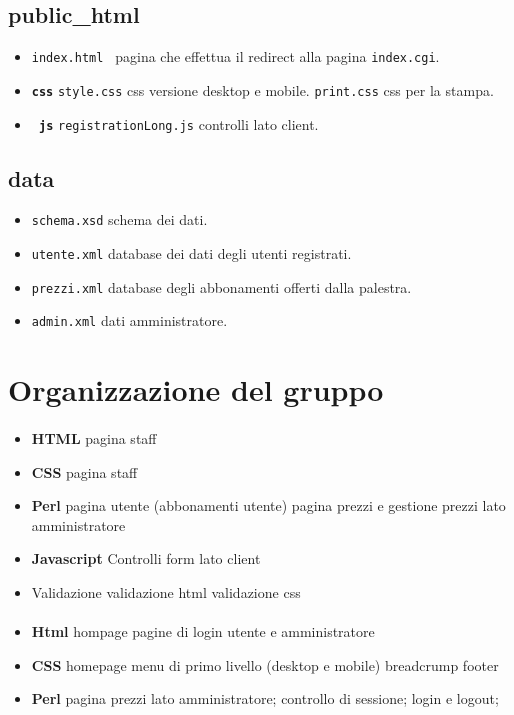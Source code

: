 \documentclass[12pt,a4paper]{article}
\begin{document}
\subsection{public\_html}
\begin{itemize}
	\item \texttt{index.html } pagina che effettua il redirect alla pagina \texttt{index.cgi}.
	\item \texttt{\textbf{css}}
		\subitem \texttt{style.css} css versione desktop e mobile. 
		\subitem \texttt{print.css} css per la stampa.
	\item\texttt{\textbf{ js}}
	\subitem \texttt{registrationLong.js} controlli lato client. 
\end{itemize}
\subsection{data}
\begin{itemize}
	\item \texttt{schema.xsd} schema dei dati. 
	\item \texttt{utente.xml} database dei dati degli utenti registrati. 
	\item \texttt{prezzi.xml} database degli abbonamenti offerti dalla palestra. 
	\item \texttt{admin.xml} dati amministratore. 
\end{itemize}

\section{Organizzazione del gruppo}
\paragraph{\TF{}}
\begin{itemize}
	\item \textbf{HTML}
	\subitem pagina staff
	\item \textbf{CSS}
	\subitem pagina staff
	\item\textbf{Perl}
	\subitem pagina utente (abbonamenti utente)
	\subitem pagina prezzi e gestione prezzi lato amministratore
	\item \textbf{Javascript}
	\subitem Controlli form lato client
	\item Validazione
	\subitem validazione html
	\subitem validazione css
	
	
\end{itemize}
\paragraph{\LB{}}
\begin{itemize}
	\item \textbf{Html}
	\subitem hompage
	\subitem pagine di login utente e amministratore
	\item\textbf{CSS}
	\subitem homepage
	\subitem menu di primo livello (desktop e mobile)
	\subitem breadcrump
	\subitem footer
	\item \textbf{Perl}
	\subitem pagina prezzi lato amministratore;
	\subitem controllo di sessione;
	\subitem login e logout;
\end{itemize}
\end{document}
